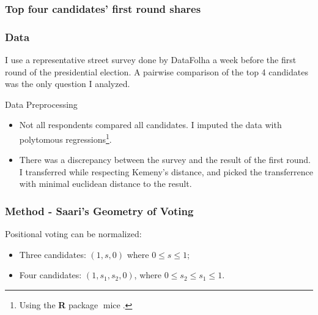 \documentclass[xcolor={svgnames}]{beamer}
\begin{document}
\begin{frame}
  \frametitle{Top four candidates' first round shares }
{\centering
}
\end{frame}

\begin{frame}
  \frametitle{Data}

   I use a representative street survey done by DataFolha a week before the first round of the presidential election. A pairwise comparison of the top 4 candidates was the only question I analyzed.

\end{frame}

\begin{frame}{Data Preprocessing}
  \begin{itemize}
    \item Not all respondents compared all candidates. I imputed the data with polytomous regressions\footnote{Using the \textbf{\textsf{R}} package
          \(\operatorname{mice}.\)}.
    \item There was a discrepancy between the survey and the result of the first
          round. I transferred while respecting Kemeny's distance, and picked
          the transferrence with minimal euclidean distance to the result.
  \end{itemize}
\end{frame}
\begin{frame}
  \frametitle{Method - Saari's Geometry of Voting }

     Positional voting can be normalized:
    \begin{itemize}
      \item Three candidates: \((1,s,0)\) where \(0 \leq s \leq 1\);
      \item Four candidates: \((1,s_{1},s_{2},0)\),
            where \(0 \leq s_{2} \leq s_{1} \leq 1\).
    \end{itemize}
  \end{frame}
\end{document}
